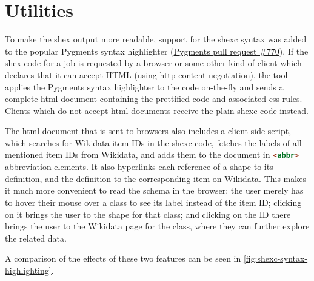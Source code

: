 \section{Utilities} %
\label{sec:wdsi:utilities}

To make the \gls{shex} output more readable,
support for the \gls{shexc} syntax was added to the popular Pygments syntax highlighter
(\href{https://bitbucket.org/birkenfeld/pygments-main/pull-requests/770}{Pygments pull request \#770}).
If the \gls{shex} code for a \gls{job}
is requested by a browser
or some other kind of client which declares that it can accept HTML
(using \gls{http} content negotiation),
the tool applies the Pygments syntax highlighter to the code on-the-fly
and sends a complete \gls{html} document containing the prettified code and associated \gls{css} rules.
Clients which do not accept \gls{html} documents receive the plain \gls{shexc} code instead.

The \gls{html} document that is sent to browsers
also includes a client-side script,
which searches for \gls{Wikidata} \glspl{item ID} in the \gls{shexc} code,
fetches the \glspl{label} of all mentioned \glspl{item ID} from \gls{Wikidata},
and adds them to the document in \lstinline[language=html]{<abbr>} abbreviation elements.
It also hyperlinks each reference of a \gls{shape} to its definition,
and the definition to the corresponding \gls{item} on \gls{Wikidata}.
This makes it much more convenient to read the \gls{schema} in the browser:
the user merely has to hover their mouse over a class to see its \gls{label} instead of the \gls{item ID};
clicking on it brings the user to the \gls{shape} for that class;
and clicking on the ID there brings the user to the \gls{Wikidata} page for the class,
where they can further explore the related data.

A comparison of the effects of these two features
can be seen in \cref{fig:shexc-syntax-highlighting}.

